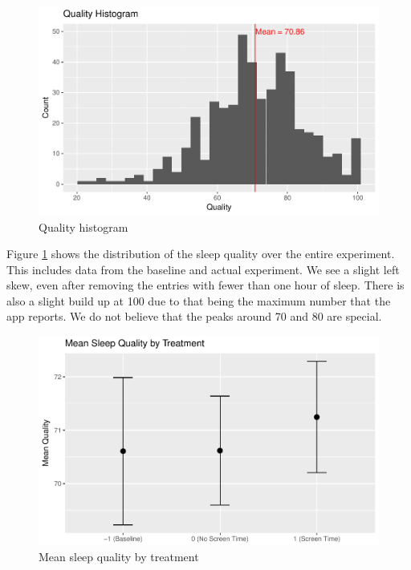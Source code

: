 \documentclass[]{article}
\begin{document}
\begin{figure}
\centering
\includegraphics{report_files/figure-latex/quality_histogram-1.pdf}
\caption{\label{fig:quality_histogram} Quality histogram}
\end{figure}

Figure \ref{fig:quality_histogram} shows the distribution of the sleep
quality over the entire experiment. This includes data from the baseline
and actual experiment. We see a slight left skew, even after removing
the entries with fewer than one hour of sleep. There is also a slight
build up at 100 due to that being the maximum number that the app
reports. We do not believe that the peaks around 70 and 80 are special.

\begin{figure}
\centering
\includegraphics{report_files/figure-latex/quality_by_treatment_fig-1.pdf}
\caption{\label{fig:quality_by_treatment_fig} Mean sleep quality by
treatment}
\end{figure}
\end{document}
